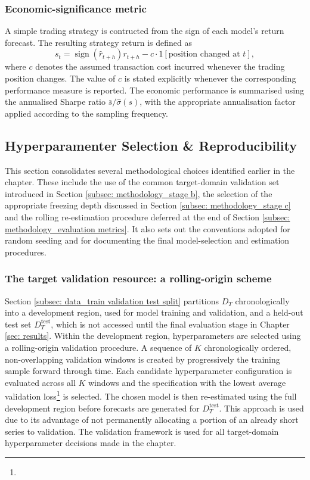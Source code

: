 \subsubsection{Economic-significance metric} \label{subsubsec: methodology_evaluation metrics_economic-significance metric}
A simple trading strategy is contructed from the sign of each model's return forecast. The resulting strategy return is defined as
\begin{equation}
s_t=\operatorname{sign}\left(\hat{r}_{t+h}\right) r_{t+h}-c \cdot 1[\text {position changed at } t],
\end{equation}
\noindent where $c$ denotes the assumed transaction cost incurred whenever the trading position changes. The value of $c$ is stated explicitly whenever the corresponding performance measure is reported. The economic performance is summarised using the annualised Sharpe ratio ${\bar{s}}/{\widehat{\sigma}(s)}$, with the appropriate annualisation factor applied according to the sampling frequency. 
 

\subsection{Hyperparamenter Selection \& Reproducibility} \label{subsec: methodology_hyperparameter selection}
This section consolidates several methodological choices identified earlier in the chapter. These include the use of the common target-domain validation set introduced in Section \ref{subsec: methodology_stage b}, the selection of the appropriate freezing depth discussed in Section \ref{subsec: methodology_stage c} and the rolling re-estimation procedure deferred at the end of Section \ref{subsec: methodology_evaluation metrics}. It also sets out the conventions adopted for random seeding and for documenting the final model-selection and estimation procedures.

\subsubsection{The target validation resource: a rolling-origin scheme}
Section \ref{subsec: data_train validation test split} partitions $D_T$ chronologically into a development region, used for model training and validation, and a held-out test set $D_T^\text{test}$, which is not accessed until the final evaluation stage in Chapter \ref{sec: results}. Within the development region, hyperparameters are selected using a rolling-origin validation procedure. A sequence of $K$ chronologically ordered, non-overlapping validation windows is created by progressively  the training sample forward through time. Each candidate hyperparameter configuration is evaluated across all $K$ windows and the specification with the lowest average validation loss\footnote{} is selected. The chosen model is then re-estimated using the full development region before forecasts are generated for $D_T^\text{test}$. This approach is used due to its advantage of not permanently allocating a portion of an already short series to validation. The validation framework is used for all target-domain hyperparameter decisions made in the chapter.

